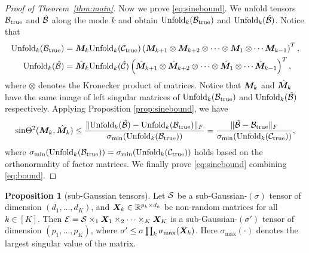 \documentclass[12pt]{article}
\theoremstyle{definition}
\newtheorem{prop}{Proposition}
\theoremstyle{definition}
\begin{document}
\begin{proof}[Proof of Theorem~\ref{thm:main}]
Now we prove \eqref{eq:sinebound}.
We unfold tensors $\mathcal{B}_{\textup{true}}$ and $\hat{\mathcal{B}}$ along the mode $k$ and obtain $\text{Unfold}_k(\mathcal{B}_{\textup{true}})$ and $\text{Unfold}_k(\hat{\mathcal{B}})$. Notice that 
\begin{align}
    \text{Unfold}_k(\mathcal{B}_{\textup{true}}) &= \bm M_k \text{Unfold}_k(\mathcal{C}_{\textup{true}})\left(\bm M_{k+1}\otimes\bm M_{k+2}\otimes \cdots\otimes \bm M_1\otimes \cdots\bm M_{k-1}\right)^T,\\
    \text{Unfold}_k(\hat{\mathcal{B}}) &= \hat{\bm M}_k \text{Unfold}_k(\hat{\mathcal{C}})\left(\hat{\bm M}_{k+1}\otimes\hat{\bm M}_{k+2}\otimes \cdots\otimes \hat{\bm M}_1\otimes \cdots\hat{\bm M}_{k-1}\right)^T,
\end{align} where $\otimes$ denotes the Kronecker product of matrices.
Notice that $\bm M_k$ and $\hat{\bm M}_k$ have the same image of left singular matrices of $\text{Unfold}_k(\mathcal{B}_{\textup{true}})$ and $\text{Unfold}_k(\hat{\mathcal{B}})$ respectively.  Applying Proposition \ref{prop:sinebound}, we have
\begin{align}
    \text{sin}\Theta^2(\bm M_k,\hat{\bm M}_k)\leq \frac{\lVert\text{Unfold}_k(\hat{\mathcal{B}})-\text{Unfold}_k(\mathcal{B}_{\textup{true}})\rVert_F}{\sigma_{\text{min}}(\text{Unfold}_k(\mathcal{B}_{\textup{true}}))}= \frac{\lVert\hat{\mathcal{B}}-\mathcal{B}_{\textup{true}}\rVert_F}{\sigma_{\text{min}}(\text{Unfold}_k(\mathcal{C}_{\textup{true}}))},
\end{align} where $\sigma_{\text{min}}(\text{Unfold}_k(\mathcal{B}_{\textup{true}})) = \sigma_{\text{min}}(\text{Unfold}_k(\mathcal{C}_{\textup{true}}))$ holds based on the orthonormality of factor matrices. We finally prove \eqref{eq:sinebound} combining \eqref{eq:bound}.
\end{proof}



\begin{prop}[sub-Gaussian tensors]\label{prop:sub}
Let $\mathcal{S}$ be a sub-Gaussian-$(\sigma)$ tensor of dimension $(d_1,\ldots,d_K)$, and $\bm X_k\in\mathbb{R}^{p_k\times d_k}$ be non-random matrices for all $k\in[K]$. Then $\mathcal{E}=\mathcal{S} \times_1  \bm X_1\times_2\cdots\times_K  \bm X_K$ is a sub-Gaussian-$(\sigma')$ tensor of dimension $(p_1,\ldots,p_K)$, where $\sigma'\leq \sigma \prod_k\sigma_{\max}(\bm X_k)$. Here $\sigma_{\max}(\cdot)$ denotes the largest singular value of the matrix. 
\end{prop}
\end{document}
